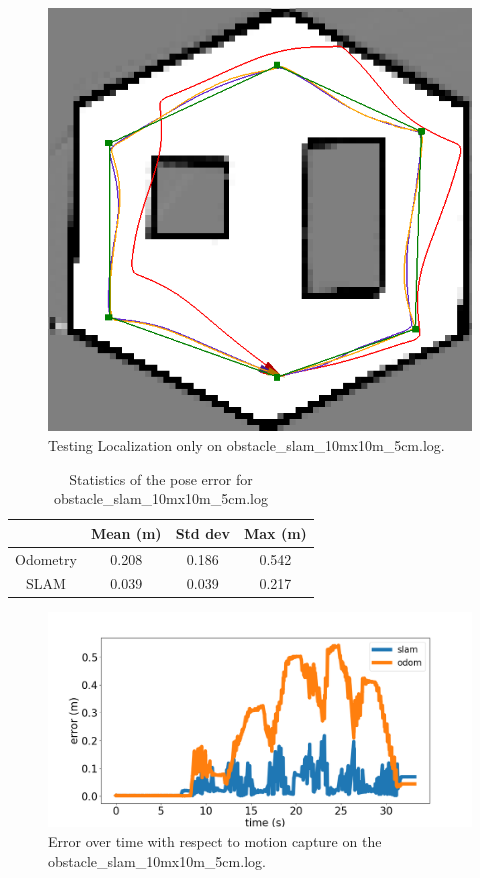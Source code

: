 \documentclass[journal]{IEEEtran}
\begin{document}
\begin{figure}
    \centering
    \includegraphics[width=1\linewidth]{obstacle_slam_10mx10m_5cm.png}
    \caption{Testing Localization only on obstacle\_slam\_10mx10m\_5cm.log.}
    \label{fig:localization}
\end{figure}

\begin{table}[b]
    \centering
    \begin{tabular}{|c|c|c|c|} \hline
      & Mean (m) &   Std dev &   Max (m) \\ \hline
      Odometry & 0.208  & 0.186  &  0.542 \\ \hline
      SLAM & 0.039 & 0.039 &  0.217 \\ \hline
    \end{tabular}
\caption{Statistics of the pose error for obstacle\_slam\_10mx10m\_5cm.log}
    \label{tab:localization_error}
\end{table}

\begin{figure}[t]
    \centering
    \includegraphics[width=1\linewidth]{localization_error.png}
    \caption{Error over time with respect to motion capture on the obstacle\_slam\_10mx10m\_5cm.log.}
    \label{fig:localization_error}
\end{figure}
\end{document}
